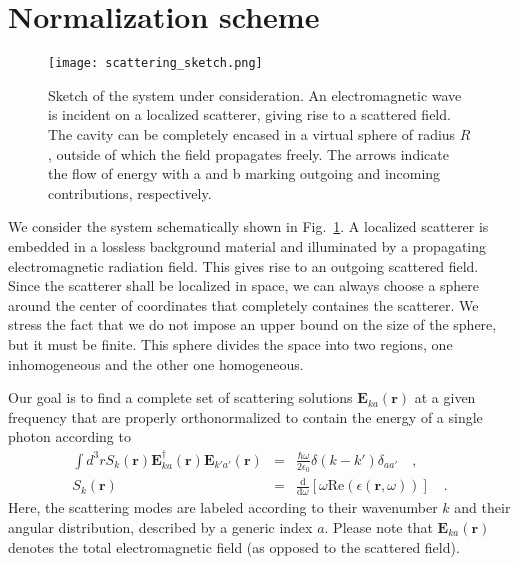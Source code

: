 \documentclass[10pt,letterpaper]{article}
\renewcommand{\vec}[1]{\mathbf{#1}}
\begin{document}
\section{Normalization scheme}
\label{sec:scheme}

\begin{figure}
\begin{center}
\texttt{[image: scattering\_sketch.png]}
\end{center}
\caption{Sketch of the system under consideration. An electromagnetic wave is incident on a localized scatterer, giving rise to a scattered field. The cavity can be completely encased in a virtual sphere of radius $R$, outside of which the field propagates freely. The arrows indicate the flow of energy with a and b marking outgoing and incoming contributions, respectively.}
\label{fig:scatter_geometry}
\end{figure}

We consider the system schematically shown in Fig.~\ref{fig:scatter_geometry}. A localized scatterer is embedded in a lossless background material and illuminated by a propagating electromagnetic radiation field. This gives rise to an outgoing scattered field. Since the scatterer shall be localized in space, we can always choose a sphere around the center of coordinates that completely containes the scatterer. We stress the fact that we do not impose an upper bound on the size of the sphere, but it must be finite. This sphere divides the space into two regions, one inhomogeneous and the other one homogeneous.

Our goal is to find a complete set of scattering solutions $\vec{E}_{ka}(\vec{r})$ at a given frequency that are properly orthonormalized to contain the energy of a single photon according to \cite{Landau1984, Vogel1994}
\begin{eqnarray}\label{eq:normalisation_integral}
\int d^{3}rS_{k}(\vec{r})\vec{E}_{ka}^{\dagger}(\vec{r})\vec{E}_{k'a'}(\vec{r}) &=& \frac{\hbar\omega}{2\epsilon_{0}}\delta(k-k')\delta_{aa'} \quad , \\
S_k(\vec{r}) &=& \frac{\text{d}}{\text{d}\omega}\left[\omega\text{Re}\left(\epsilon(\vec{r},\omega)\right)\right] \quad .
\end{eqnarray}
Here, the scattering modes are labeled according to their wavenumber $k$ and their angular distribution, described by a generic index $a$. Please note that $\vec{E}_{ka}(\vec{r})$ denotes the total electromagnetic field (as opposed to the scattered field).
\end{document}

